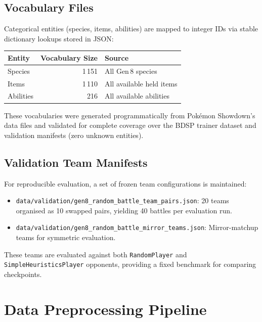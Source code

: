 \subsection{Vocabulary Files}

Categorical entities (species, items, abilities) are mapped to integer IDs via
stable dictionary lookups stored in JSON:

\begin{center}
\small
\begin{tabularx}{0.8\textwidth}{l r l}
  \toprule
  \textbf{Entity} & \textbf{Vocabulary Size} & \textbf{Source} \\
  \midrule
  Species  & 1\,151 & All Gen\,8 species \\
  Items    & 1\,110 & All available held items \\
  Abilities & 216   & All available abilities \\
  \bottomrule
\end{tabularx}
\end{center}

These vocabularies were generated programmatically from Pok\'{e}mon Showdown's
data files and validated for complete coverage over the BDSP trainer dataset
and validation manifests (zero unknown entities).

\subsection{Validation Team Manifests}

For reproducible evaluation, a set of frozen team configurations is maintained:

\begin{itemize}
  \item \texttt{data/validation/gen8\_random\_battle\_team\_pairs.json}:
        20 teams organised as 10 swapped pairs, yielding 40 battles per
        evaluation run.
  \item \texttt{data/validation/gen8\_random\_battle\_mirror\_teams.json}:
        Mirror-matchup teams for symmetric evaluation.
\end{itemize}

These teams are evaluated against both \texttt{RandomPlayer} and
\texttt{SimpleHeuristicsPlayer} opponents, providing a fixed benchmark for
comparing checkpoints.

\section{Data Preprocessing Pipeline}

